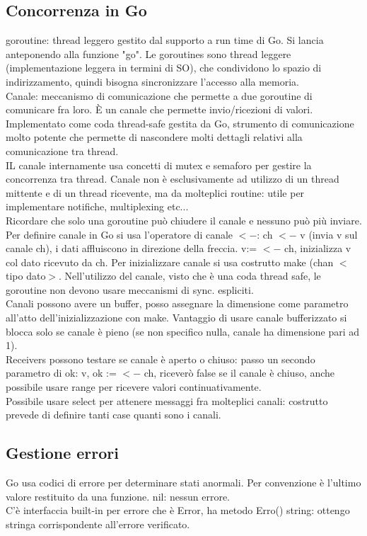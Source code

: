 \documentclass[16px]{article}
\begin{document}
\subsection{Concorrenza in Go}
goroutine: thread leggero gestito dal supporto a run time di Go. Si lancia anteponendo alla funzione "go". Le goroutines sono thread leggere (implementazione leggera in termini di SO), che condividono lo spazio di indirizzamento, quindi bisogna sincronizzare l'accesso alla memoria.\\ Canale: meccanismo di comunicazione che permette a due goroutine di comunicare fra loro. È un canale che permette invio/ricezioni di valori. Implementato come coda thread-safe gestita da Go, strumento di comunicazione molto potente che permette di nascondere molti dettagli relativi alla comunicazione tra thread.\\ IL canale internamente usa concetti di mutex e semaforo per gestire la concorrenza tra thread. Canale non è esclusivamente ad utilizzo di un thread mittente e di un thread ricevente, ma da molteplici routine: utile per implementare notifiche, multiplexing etc...\\ Ricordare che solo una goroutine può chiudere il canale e nessuno può più inviare. Per definire canale in Go si usa l'operatore di canale $<-$: ch $<-$ v (invia v sul canale ch), i dati affluiscono in direzione della freccia. v:= $<-$ ch, inizializza v col dato ricevuto da ch. Per inizializzare canale si usa costrutto make (chan $<$tipo dato$>$. Nell'utilizzo del canale, visto che è una coda thread safe, le goroutine non devono usare meccanismi di sync. espliciti.\\ Canali possono avere un buffer, posso assegnare la dimensione come parametro all'atto dell'inizializzazione con make. Vantaggio di usare canale bufferizzato si blocca solo se canale è pieno (se non specifico nulla, canale ha dimensione pari ad 1).\\ Receivers possono testare se canale è aperto o chiuso: passo un secondo parametro di ok: v, ok := $<-$ ch, riceverò false se il canale è chiuso, anche possibile usare range per ricevere valori continuativamente.\\ Possibile usare select per attenere messaggi fra molteplici canali: costrutto prevede di definire tanti case quanti sono i canali.
\subsection{Gestione errori}
Go usa codici di errore per determinare stati anormali. Per convenzione è l'ultimo valore restituito da una funzione. nil: nessun errore.\\ C'è interfaccia built-in per errore che è Error, ha metodo Erro() string: ottengo stringa corrispondente all'errore verificato.
\end{document}
